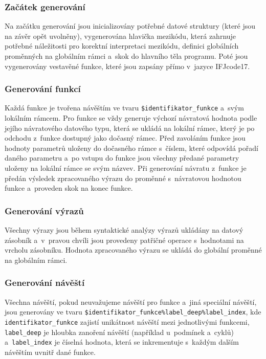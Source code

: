\documentclass[a4paper, 11pt]{article}
\begin{document}
	\subsubsection{Začátek generování}

	Na začátku generování jsou inicializovány potřebné datové struktury (které jsou na závěr
	opět uvolněny), vygenerována hlavička mezikódu, která zahrnuje potřebné náležitosti pro korektní
	interpretaci mezikódu, definici globálních proměnných na globálním rámci a~skok do hlavního
	těla programu. Poté jsou vygenerovány vestavěné funkce, které jsou zapsány přímo v~jazyce IFJcode17.

	\subsubsection{Generování funkcí}

	Každá funkce je tvořena návěštím ve tvaru \texttt{\$identifikator\_funkce} a~svým lokálním rámcem.
	Pro funkce se vždy generuje výchozí návratová hodnota podle jejího návratového datového typu,
	která se ukládá na lokální rámec, který je po odchodu z~funkce dostupný jako dočasný rámec.
	Před zavoláním funkce jsou hodnoty parametrů uloženy do dočasného rámce s~číslem, které
	odpovídá pořadí daného parametru a~po vstupu do funkce jsou všechny předané parametry uloženy na
	lokální rámce se svým názvev. Při generování návratu z~funkce je předán výsledek zpracovaného
	výrazu do proměnné s~návratovou hodnotou funkce a~proveden skok na konec funkce.

	\subsubsection{Generování výrazů}

	Všechny výrazy jsou během syntaktické analýzy výrazů ukládány na datový zásobník a~v~pravou
	chvíli jsou provedeny patřičné operace s~hodnotami na vrcholu zásobníku. Hodnota zpracovaného
	výrazu se ukládá do globální proměnné na globálním rámci.

	\subsubsection{Generování návěští}

	Všechna návěští, pokud neuvažujeme návěští pro funkce a~jiná speciální návěští, jsou generovány
	ve tvaru \texttt{\$identifikator\_funkce\%label\_deep\%label\_index}, kde
	\texttt{identifikator\_funkce} zajistí unikátnost návěští mezi jednotlivými funkcemi,
	\texttt{label\_deep} je hloubka zanoření návěští (například u~podmínek a~cyklů)
	a~\texttt{label\_index} je číselná hodnota, která se inkrementuje s~každým dalším návěštím uvnitř
	dané funkce.
\end{document}
